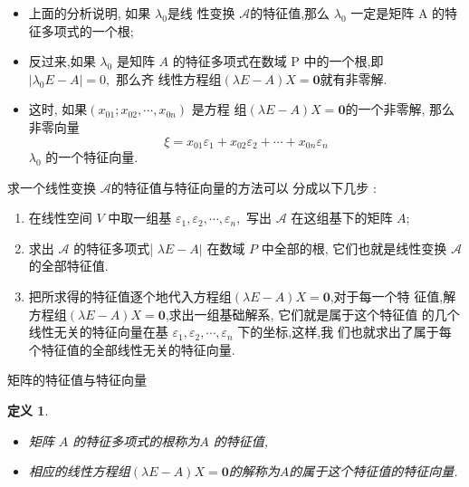 \documentclass[13pt]{beamer}
\newtheorem*{defi}{定义}
\def\A{\mathscr{A}}
\begin{document}
\begin{frame}
\begin{itemize}
\item 上面的分析说明, 如果 $\lambda_0$是线 性变换 $\A$的特征值,那么 $\lambda_0$
一定是矩阵 A 的特征多项式的一个根;
\item 反过来,如果 $\lambda_{0}$ 是知阵 ${A}$ 的特征多项式在数域 P 中的一个根,即  $|\lambda_{0} {E}-{A} |=0,$ 那么齐 线性方程组$(\lambda E-A)X=\mathbf{0}$就有非零解. 
\item 这时, 如果$\left( x_{01} ; x_{02}, \cdots, x_{0 n}\right)$ 是方程
组$(\lambda E-A)X=\mathbf{0}$的一个非零解, 那么非零向量
\[
\xi=x_{01} \varepsilon_{1}+x_{02} \varepsilon_{2}+\cdots+x_{0 n} \varepsilon_{n}
\]
$\lambda_{0}$ 的一个特征向量. 
\end{itemize}





\end{frame}

\begin{frame}
求一个线性变换 $\A$的特征值与特征向量的方法可以
分成以下几步 :
\begin{enumerate}
	\item 在线性空间 $V$ 中取一组基 ${\varepsilon}_{1}, {\varepsilon}_{2}, \cdots, {\varepsilon}_{n},$ 写出 $\mathscr{A}$ 在这组基下的矩阵 $A$;
	\item 求出 $\A$ 的特征多项式| $\lambda {E}-{A} |$ 在数域 $P$ 中全部的根, 它们也就是线性变换 $\A$ 的全部特征值. 
	\item 把所求得的特征值逐个地代入方程组$(\lambda E-A)X=\mathbf{0}$,对于每一个特 征值,解方程组$(\lambda E-A)X=\mathbf{0}$,求出一组基础解系, 它们就是属于这个特征值 的几个线性无关的特征向量在基 ${\varepsilon}_{1}, {\varepsilon}_{2}, \cdots, {\varepsilon}_{n}$ 下的坐标,这样,我
	们也就求出了属于每个特征值的全部线性无关的特征向量. 
\end{enumerate}

\end{frame}

\begin{frame}{矩阵的特征值与特征向量}
\begin{defi}
\begin{itemize}
	\item 矩阵 $A$ 的特征多项式的根称为$A$ 的特征值,
	\item 相应的线性方程组$(\lambda E-A)X=\mathbf{0}$的解称为$A$的属于这个特征值的特征向量.  
\end{itemize}

\end{defi}
\end{frame}
\end{document}
